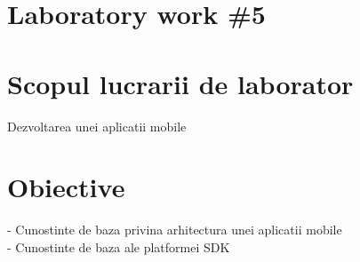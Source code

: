 \section*{Laboratory work \#5}

\section{Scopul lucrarii de laborator}
Dezvoltarea unei aplicatii mobile
\section{Obiective}

- Cunostinte de baza privina arhitectura unei aplicatii mobile\\
\indent 
- Cunostinte de baza ale platformei SDK

\clearpage